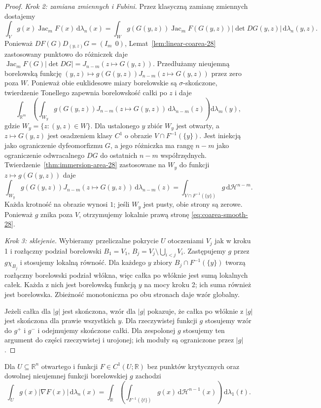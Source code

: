 \begin{proof}
\emph{Krok 2: zamiana zmiennych i Fubini.}
Przez klasyczną zamianę zmiennych dostajemy
\[
 \int_V g(x)\operatorname{Jac}_mF(x)\,\mathrm d\lambda_n(x)
 =\int_W g(G(y,z))\operatorname{Jac}_mF(G(y,z))
 |\det DG(y,z)|\,\mathrm d\lambda_n(y,z).
\]
Ponieważ $DF(G)D_{(y,z)}G=(I_m\ \ 0)$,
Lemat~\ref{lem:linear-coarea-28} zastosowany
punktowo do różniczek daje
$\operatorname{Jac}_mF(G)|\det DG|=
J_{n-m}(z\mapsto G(y,z))$.
Przedłużamy nieujemną borelowską funkcję
$(y,z)\mapsto g(G(y,z))J_{n-m}(z\mapsto G(y,z))$
przez zero poza $W$. Ponieważ obie euklidesowe miary
borelowskie są $\sigma$-skończone, twierdzenie Tonellego
zapewnia borelowskość całki po $z$ i daje
\[
 \int_{\mathbb R^m}\left(\int_{W_y}
 g(G(y,z))J_{n-m}(z\mapsto G(y,z))
 \,\mathrm d\lambda_{n-m}(z)\right)\mathrm d\lambda_m(y),
\]
gdzie $W_y=\{z:(y,z)\in W\}$.
Dla ustalonego $y$ zbiór $W_y$ jest otwarty, a
$z\mapsto G(y,z)$ jest osadzeniem klasy $C^1$
o obrazie $V\cap F^{-1}(\{y\})$. Jest iniekcją
jako ograniczenie dyfeomorfizmu $G$, a jego
różniczka ma rangę $n-m$ jako ograniczenie
odwracalnego $DG$ do ostatnich $n-m$ współrzędnych.
Twierdzenie~\ref{thm:immersion-area-28} zastosowane
na $W_y$ do funkcji $z\mapsto g(G(y,z))$ daje
\[
 \int_{W_y}g(G(y,z))J_{n-m}(z\mapsto G(y,z))
 \,\mathrm d\lambda_{n-m}(z)
 =\int_{V\cap F^{-1}(\{y\})}g\,\mathrm d\mathcal H^{n-m}.
\]
Każda krotność na obrazie wynosi $1$; jeśli $W_y$
jest pusty, obie strony są zerowe. Ponieważ $g$
znika poza $V$, otrzymujemy lokalnie prawą stronę
\eqref{eq:coarea-smooth-28}.

\emph{Krok 3: sklejenie.}
Wybieramy przeliczalne pokrycie $U$ otoczeniami
$V_j$ jak w kroku 1 i rozłączny podział borelowski
$B_1=V_1$, $B_j=V_j\setminus\bigcup_{i<j}V_i$.
Zastępujemy $g$ przez $g\chi_{B_j}$ i stosujemy
lokalną równość. Dla każdego $y$ zbiory
$B_j\cap F^{-1}(\{y\})$ tworzą rozłączny
borelowski podział włókna, więc całka po włóknie
jest sumą lokalnych całek. Każda z nich jest
borelowską funkcją $y$ na mocy kroku 2;
ich suma również jest borelowska. Zbieżność
monotoniczna po obu stronach daje wzór globalny.

Jeżeli całka dla $|g|$ jest skończona, wzór dla
$|g|$ pokazuje, że całka po włóknie z $|g|$
jest skończona dla prawie wszystkich $y$.
Dla rzeczywistej funkcji $g$ stosujemy wzór
do $g^+$ i $g^-$ i odejmujemy skończone całki.
Dla zespolonej $g$ stosujemy ten argument
do części rzeczywistej i urojonej; ich moduły
są ograniczone przez $|g|$.
\end{proof}

\begin{wniosek}
\label{cor:coarea-level-28}
Dla $U\subseteq\mathbb R^n$ otwartego i
funkcji $F\in C^1(U;\mathbb R)$
bez punktów krytycznych oraz dowolnej
nieujemnej funkcji borelowskiej $g$ zachodzi
\[
 \int_U g(x)|\nabla F(x)|\,\mathrm d\lambda_n(x)
 =\int_{\mathbb R}\left(\int_{F^{-1}(\{t\})}
 g(x)\,\mathrm d\mathcal H^{n-1}(x)\right)
 \,\mathrm d\lambda_1(t).
\]
\end{wniosek}

